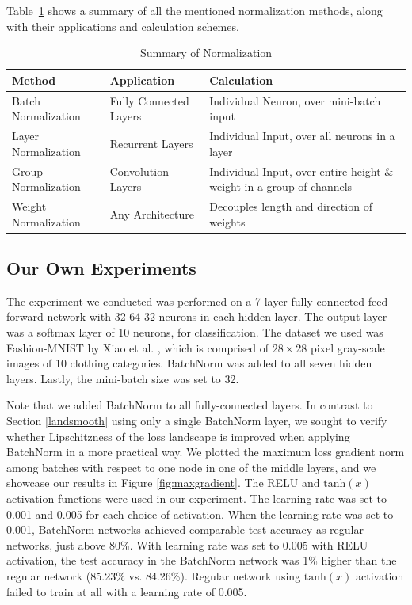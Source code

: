 \documentclass{article}
\begin{document}
\textbf{}

Table~\ref{normsum} shows a summary of all the mentioned normalization methods, along with their applications and calculation schemes.\\

\begingroup
\setlength{\tabcolsep}{10pt} %
\renewcommand{\arraystretch}{1.5} %
\begin{table}[h] 
\centering
 \begin{tabular}{|m{10em} | m{10em} | m{10em}|} 
 \hline
 Method & Application & Calculation\\  
 \hline
 Batch Normalization & Fully Connected Layers & Individual Neuron, over mini-batch input\\ [0.5ex] 
 \hline
 Layer Normalization & Recurrent Layers & Individual Input, over all neurons in a layer\\ [0.5ex]
 \hline
 Group Normalization & Convolution Layers & Individual Input, over entire height \& weight in a group of channels\\[0.5ex]
 \hline
 Weight Normalization & Any Architecture & Decouples length and direction of weights\\
 \hline
\end{tabular}
\caption{Summary of Normalization}
\label{normsum}
\end{table}
\endgroup

\subsection{Our Own Experiments}
The experiment we conducted was performed on a 7-layer fully-connected feed-forward network with 32-64-32 neurons in each hidden layer. The output layer was a softmax layer of 10 neurons, for classification. The dataset we used was Fashion-MNIST by Xiao et al. \cite{fmnist}, which is comprised of $28\times28$ pixel gray-scale images of 10 clothing categories. BatchNorm was added to all seven hidden layers. Lastly, the mini-batch size was set to 32.

Note that we added BatchNorm to all fully-connected layers. In contrast to Section \ref{landsmooth} using only a single BatchNorm layer, we sought to verify whether Lipschitzness of the loss landscape is improved when applying BatchNorm in a more practical way. We plotted the maximum loss gradient norm among batches with respect to one node in one of the middle layers, and we showcase our results in Figure \ref{fig:maxgradient}. The RELU and $\text{tanh}(x)$ activation functions were used in our experiment. The learning rate was set to 0.001 and 0.005 for each choice of activation. When the learning rate was set to 0.001, BatchNorm networks achieved comparable test accuracy as regular networks, just above 80\%. With learning rate was set to 0.005 with RELU activation, the test accuracy in the BatchNorm network was 1\% higher than the regular network (85.23\% vs. 84.26\%). Regular network using $\text{tanh}(x)$ activation failed to train at all with a learning rate of 0.005.
\end{document}
